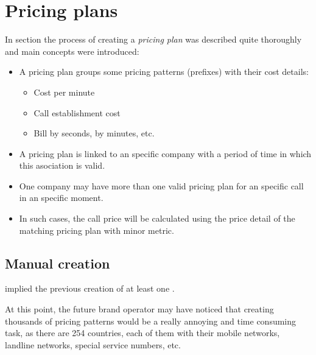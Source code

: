 \documentclass[letterpaper,10pt,english]{sphinxmanual}
\begin{document}
\section{Pricing plans}
\label{billing_and_invoices/pricing_plans:pricing-plans}\label{billing_and_invoices/pricing_plans::doc}
In {\hyperref[external_outgoing_calls/noplan_nocall:noplan\string-nocall]{}} section the process of creating a \emph{pricing plan} was
described quite thoroughly and main concepts were introduced:
\begin{itemize}
\item {} 
A pricing plan groups some pricing patterns (prefixes) with their cost details:
\begin{itemize}
\item {} 
Cost per minute

\item {} 
Call establishment cost

\item {} 
Bill by seconds, by minutes, etc.

\end{itemize}

\item {} 
A pricing plan is linked to an specific company with a period of time in which
this asociation is valid.

\item {} 
One company may have more than one valid pricing plan for an specific call in
an specific moment.

\item {} 
In such cases, the call price will be calculated using the price detail of the
matching pricing plan with minor metric.

\end{itemize}


\subsection{Manual creation}
\label{billing_and_invoices/pricing_plans:manual-creation}
{\hyperref[external_outgoing_calls/noplan_nocall:price\string-plan]{}} implied the previous
creation of at least one {\hyperref[external_outgoing_calls/noplan_nocall:price\string-pattern]{}}.

At this point, the future brand operator may have noticed that creating thousands
of pricing patterns would be a really annoying and time consuming task, as there
are 254 countries, each of them with their mobile networks, landline networks,
special service numbers, etc.
\end{document}
